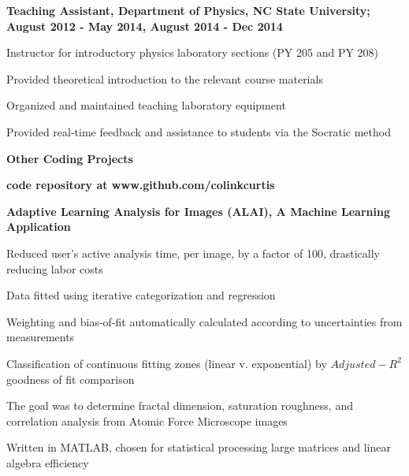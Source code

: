 \documentclass[letterpaper,final]{memoir}
\newcommand{\LargeSep}{\vspace{1.3em}}
\newcommand{\Sep}{\vspace{1.0em}}
\newcommand{\SmallSep}{\vspace{0.4em}}
\newcommand{\CVSection}[1]
	{\LARGE\textbf{#1}\par
	\SmallSep\normalsize}
\newcommand{\CVItem}[1]
	{\textbf{\color{Blue} #1}}
\begin{document}
\CVItem{Teaching Assistant, Department of Physics, NC State University; August 2012 - May 2014, August 2014 - Dec 2014}
\begin{compactitem}[\color{Blue}$\circ$]

    \SmallSep
	
    \item Instructor for introductory physics laboratory sections (PY 205 and PY 208)
    \item Provided theoretical introduction to the relevant course materials
    \item Organized and maintained teaching laboratory equipment
    \item Provided real-time feedback and assistance to students via the Socratic method
\end{compactitem}

\LargeSep


\newpage

\notoserif \CVSection{Other Coding Projects}

\normalfont

\Sep

\CVItem{code repository at www.github.com/colinkcurtis} 

\Sep

\CVItem{Adaptive Learning Analysis for Images (ALAI), A Machine Learning Application} 

\begin{compactitem}[\color{Blue}$\circ$]
   
    \SmallSep

    \item Reduced user's active analysis time, per image, by a factor of 100, drastically reducing labor costs

    \item Data fitted using iterative categorization and regression

    \item Weighting and bias-of-fit automatically calculated according to uncertainties from measurements

    \item Classification of continuous fitting zones (linear v. exponential) by $Adjusted-R^2$ goodness of fit comparison

    \item The goal was to determine fractal dimension, saturation roughness, and correlation analysis from Atomic Force Microscope images

    \item Written in MATLAB, chosen for statistical processing large matrices and linear algebra efficiency
    \Sep

\end{compactitem}
\end{document}
